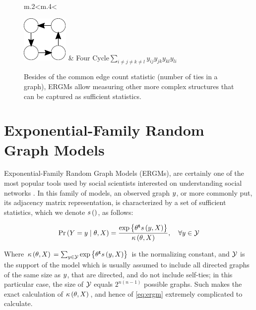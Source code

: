 \documentclass[12pt]{article}
\begin{document}
\begin{figure}[tb]
\begin{tabular}{m{.2\linewidth}<\centering m{.4\linewidth}<\raggedright}
\includegraphics[width=\fig1width]{terms/fourcycle.pdf} & Four Cycle\linebreak[4]$\sum_{i\neq j \neq k \neq l}y_{ij}y_{jk}y_{kl}y_{li}$  \\
\bottomrule
\end{tabular}
\caption{\label{fig:ergm-structs}Besides of the common edge count statistic (number of ties in a graph), ERGMs allow measuring other more complex structures that can be captured as sufficient statistics. }
\end{figure}

\section{Exponential-Family Random Graph Models}

Exponential-Family Random Graph Models (ERGMs), are certainly one of the most popular tools used by social scientists interested on understanding social networks \cite[and others]{Robins2007,Holland1981,Wasserman1996,Snijders2006}. In this family of models, an observed graph $y$, or more commonly put, its adjacency matrix representation, is characterized by a set of sufficient statistics, which we denote $s\left(\right)$, as follows:

\begin{equation}
\label{eq:ergm}
  \Prcond{\Adjmat = \adjmat}{\params, \Indepvar} = \frac{%
  	\exp{\transpose{\params}\sufstats{\adjmat, \Indepvar}}%
  }{
  	\kappa\left(\params, \Indepvar\right)
  },\quad\forall \adjmat\in\ADJMAT
\end{equation}

\noindent Where $\kappa\left(\theta, X\right){} = \sum_{y\in\mathcal{Y}}\mbox{exp}\left\{{\theta}^\mathbf{t}s\left(y, X\right)\right\}$ is the normalizing constant, and $\mathcal{Y}$ is the support of the model which is usually assumed to include all directed graphs of the same size as $y$, that are directed, and do not include self-ties; in this particular case, the size of $\mathcal{Y}$ equals $2^{n(n-1)}$ possible graphs. Such makes the exact calculation of $\kappa\left(\theta, X\right){}$, and hence of \eqref{eq:ergm} extremely complicated to calculate.
\end{document}
